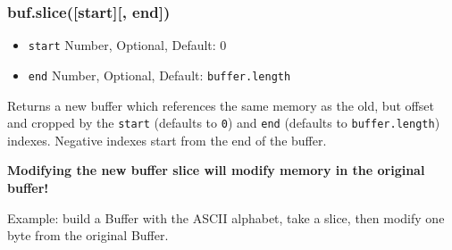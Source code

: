 \subsubsection{buf.slice({[}start{]}{[},
end{]})}\label{buf.slicestart-end}

\begin{itemize}
\itemsep1pt\parskip0pt
\item
  \texttt{start} Number, Optional, Default: 0
\item
  \texttt{end} Number, Optional, Default: \texttt{buffer.length}
\end{itemize}

Returns a new buffer which references the same memory as the old, but
offset and cropped by the \texttt{start} (defaults to \texttt{0}) and
\texttt{end} (defaults to \texttt{buffer.length}) indexes. Negative
indexes start from the end of the buffer.

\textbf{Modifying the new buffer slice will modify memory in the
original buffer!}

Example: build a Buffer with the ASCII alphabet, take a slice, then
modify one byte from the original Buffer.

\begin{Shaded}
\begin{Highlighting}[]
  \NormalTok{(}\NormalTok{);}

 \NormalTok{(}   
  \NormalTok{; }
\NormalTok{\}}

 \NormalTok{(}\NormalTok{, }\NormalTok{);}
\NormalTok{(}\NormalTok{(}\NormalTok{, }\NormalTok{, }\NormalTok{));}
\NormalTok{buf1[}\NormalTok{] = }\NormalTok{;}
\NormalTok{(}\NormalTok{(}\NormalTok{, }\NormalTok{, }\NormalTok{));}

\end{Highlighting}
\end{Shaded}

